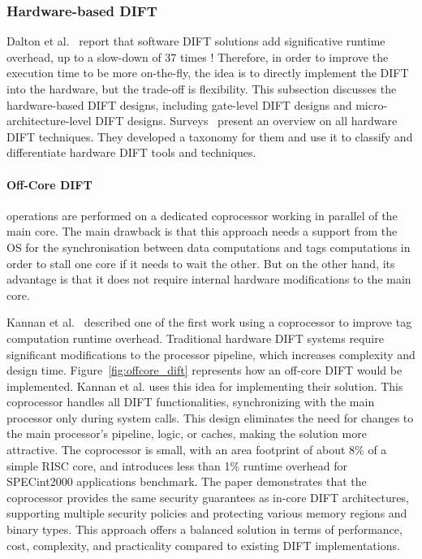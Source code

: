 \subsubsection{Hardware-based DIFT}
Dalton et al.~\cite{DKK-07-sigarch} report that software DIFT solutions add significative runtime overhead, up to a slow-down of 37 times ! Therefore, in order to improve the execution time to be more on-the-fly, the idea is to directly implement the DIFT into the hardware, but the trade-off is flexibility.
This subsection discusses the hardware-based DIFT designs, including gate-level DIFT designs and micro-architecture-level DIFT designs. Surveys~\cite{HAK-21-acmcsur,BSMCVEJCO-21-acmcsur} present an overview on all hardware DIFT techniques. They developed a taxonomy for them and use it to classify and differentiate hardware DIFT tools and techniques.

\paragraph{Off-Core DIFT} operations are performed on a dedicated coprocessor working in parallel of the main core.
The main drawback is that this approach needs a support from the OS for the synchronisation between data computations and tags computations in order to stall one core if it needs to wait the other. But on the other hand, its advantage is that it does not require internal hardware modifications to the main core.

Kannan et al.~\cite{KDK-09-dsn} described one of the first work using a coprocessor to improve tag computation runtime overhead. Traditional hardware DIFT systems require significant modifications to the processor pipeline, which increases complexity and design time. Figure~\ref{fig:offcore_dift} represents how an off-core DIFT would be implemented. Kannan et al. uses this idea for implementing their solution.
This coprocessor handles all DIFT functionalities, synchronizing with the main processor only during system calls. This design eliminates the need for changes to the main processor's pipeline, logic, or caches, making the solution more attractive. The coprocessor is small, with an area footprint of about 8\% of a simple RISC core, and introduces less than 1\% runtime overhead for SPECint2000 applications benchmark. The paper demonstrates that the coprocessor provides the same security guarantees as in-core DIFT architectures, supporting multiple security policies and protecting various memory regions and binary types. This approach offers a balanced solution in terms of performance, cost, complexity, and practicality compared to existing DIFT implementations.

